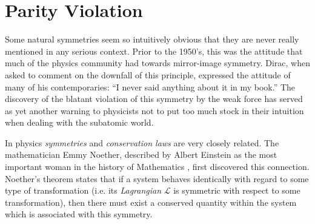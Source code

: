 \documentclass[12pt]{book}
\begin{document}
\chapter{Parity Violation}

Some natural symmetries seem so intuitively obvious that they are never really mentioned in any serious context. Prior to the 1950's, this was the attitude that much of the physics community had towards mirror-image symmetry. Dirac, when asked to comment on the downfall of this principle, expressed the attitude of many of his contemporaries\cite{polkinghorne}: ``I never said anything about it in my book.'' The discovery of the blatant violation of this symmetry by the weak force has served as yet another warning to physicists not to put too much stock in their intuition when dealing with the subatomic world. 

In physics \emph{symmetries} and \emph{conservation laws} are very closely related. The mathematician Emmy Noether, described by Albert Einstein as the most important woman in the history of Mathematics \cite{einstein}, first discovered this connection. Noether's theorem states that if a system behaves identically with regard to some type of transformation (i.e. its \emph{Lagrangian} $\mathcal{L}$ is symmetric with respect to some transformation), then there must exist a conserved quantity within the system which is associated with this symmetry.
\end{document}
